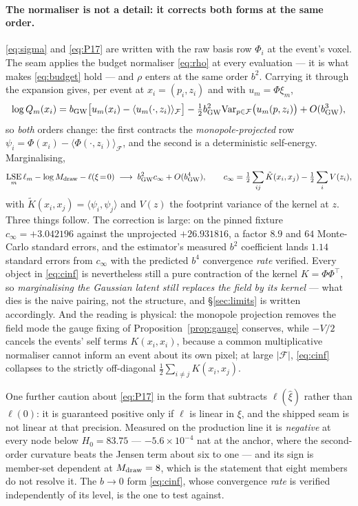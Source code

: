 \documentclass[11pt]{article}
\theoremstyle{definition}
\theoremstyle{remark}
\newcommand{\bgw}{b_{\rm GW}}
\newcommand{\Mdraw}{M_{\rm draw}}
\newcommand{\LSE}{\mathop{\mathrm{LSE}}}
\newcommand{\Var}{\mathrm{Var}}
\begin{document}
\paragraph{The normaliser is not a detail: it corrects both forms at the same
order.} \eqref{eq:sigma} and \eqref{eq:P17} are written with the raw basis row
$\Phi_i$ at the event's voxel. The seam applies the budget normaliser
\eqref{eq:rho} at every evaluation --- it is what makes \eqref{eq:budget} hold ---
and $\rho$ enters at the same order $b^2$. Carrying it through the expansion gives,
per event at $x_i=(p_i,z_i)$ and with $u_m=\Phi\xi_m$,
\begin{equation}
  \log Q_m(x_i)=\bgw\big[u_m(x_i)-\langle u_m(\cdot,z_i)\rangle_{\mathcal F}\big]
  -\tfrac12\bgw^2\Var_{p\in\mathcal F}\big(u_m(p,z_i)\big)+O(\bgw^3),
  \label{eq:logQexpansion}
\end{equation}
so \emph{both} orders change: the first contracts the \emph{monopole-projected}
row $\psi_i=\Phi(x_i)-\langle\Phi(\cdot,z_i)\rangle_{\mathcal F}$, and the second
is a deterministic self-energy. Marginalising,
\begin{equation}
  \LSE_m\ell_m-\log\Mdraw-\ell(\xi\!=\!0)\;\longrightarrow\;\bgw^2c_\infty+O(\bgw^4),
  \qquad
  c_\infty=\tfrac12\sum_{ij}\tilde K(x_i,x_j)-\tfrac12\sum_iV(z_i),
  \label{eq:cinf}
\end{equation}
with $\tilde K(x_i,x_j)=\langle\psi_i,\psi_j\rangle$ and $V(z)$ the footprint
variance of the kernel at $z$. Three things follow. The correction is large: on
the pinned fixture $c_\infty=+3.042196$ against the unprojected $+26.931816$, a
factor $8.9$ and $64$ Monte-Carlo standard errors, and the estimator's measured
$b^2$ coefficient lands $1.14$ standard errors from $c_\infty$ with the predicted
$b^4$ convergence \emph{rate} verified. Every object in \eqref{eq:cinf} is
nevertheless still a pure contraction of the kernel $K=\Phi\Phi^{\!\top}$, so
\emph{marginalising the Gaussian latent still replaces the field by its kernel} ---
what dies is the naive pairing, not the structure, and \S\ref{sec:limits} is
written accordingly. And the reading is physical: the monopole projection removes
the field mode the gauge fixing of Proposition~\ref{prop:gauge} conserves, while
$-V/2$ cancels the events' self terms $K(x_i,x_i)$, because a common
multiplicative normaliser cannot inform an event about its own pixel; at large
$|\mathcal F|$, \eqref{eq:cinf} collapses to the strictly off-diagonal
$\tfrac12\sum_{i\neq j}K(x_i,x_j)$.

One further caution about \eqref{eq:P17} in the form that subtracts
$\ell(\hat\xi)$ rather than $\ell(0)$: it is guaranteed positive only if $\ell$
is linear in $\xi$, and the shipped seam is not linear at that precision.
Measured on the production line it is \emph{negative} at every node below
$H_0=83.75$ --- $-5.6\times10^{-4}$ nat at the anchor, where the second-order
curvature beats the Jensen term about six to one --- and its sign is
member-set dependent at $\Mdraw=8$, which is the statement that eight members do
not resolve it. The $b\to0$ form \eqref{eq:cinf}, whose convergence \emph{rate}
is verified independently of its level, is the one to test against.
\end{document}
